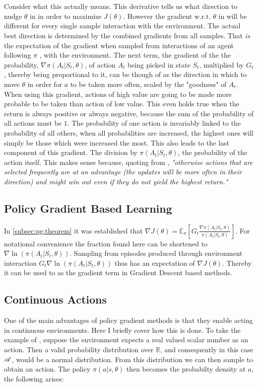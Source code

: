 \noindent
\\ \\ Consider what this actually means. This derivative tells us what direction to nudge $\theta$ in in order to maximize $J(\theta)$. However the gradient w.r.t. $\theta$ in will be different for every single sample interaction with the environment. The actual best direction is determined by the combined gradients from all samples. That \textit{is} the expectation of the gradient when sampled from interactions of an agent following $\pi$ , with the environment.
\nolinebreak
The next term, the gradient of the the probability, $\nabla \pi(A_t|S_t, \theta)$, of action $A_t$ being picked in state $S_t$, multiplied by $G_t$, thereby being proportional to it, can be though of as the direction in which to move $\theta$ in order for $a$ to be taken more often, scaled by the "goodness" of $A_t$. When using this gradient, actions of high value are going to be made more probable to be taken than action of low value. This even holds true when the return is always positive or always negative, because the sum of the probability of all actions must be $1$. The probability of one action is invariably linked to the probability of all others, when all probabilities are increased, the highest ones will simply be those which were increased the most. This also leads to the last component of this gradient. The division by $\pi(A_t|S_t, \theta)$, the probability of the action itself. This makes sense because, quoting from , \textit{"otherwise actions that are selected frequently are at an advantage (the updates will be more often in their direction) and might win out even if they do not yield the highest return." }

\subsection{Policy Gradient Based Learning}\label{subsec:pg:reinforce}
In \ref{subsec:pg:theorem} it was established that $\nabla J(\theta) = \mathbb{E}_\pi \left[G_t \frac{\nabla \pi(A_t|S_t, \theta)}{\pi(A_t|S_t, \theta)}\right]$. For notational convenience the fraction found here can be shortened to $\nabla \ln(\pi(A_t|S_t, \theta))$. Sampling from episodes produced through environment interaction $G_t\nabla \ln(\pi(A_t|S_t, \theta))$ thus has an expectation of $\nabla J(\theta)$. Thereby it can be used to as the gradient term in Gradient Descent based methods. 

\subsection{Continuous Actions}\label{subsec:pg:continuous}
One of the main advantages of policy gradient methods is that they enable acting in continuous environments. Here I briefly cover how this is done. To take the example of , suppose the environment expects a real valued scalar number as an action. Then a valid probability distribution over $\mathbb{R}$, and consequently in this case $\mathscr{A}$, would be a normal distribution. From this distribution we can then sample to obtain an action. The policy $\pi(a|s,\theta)$ then becomes the probabilty density at $a$, the following arises:

